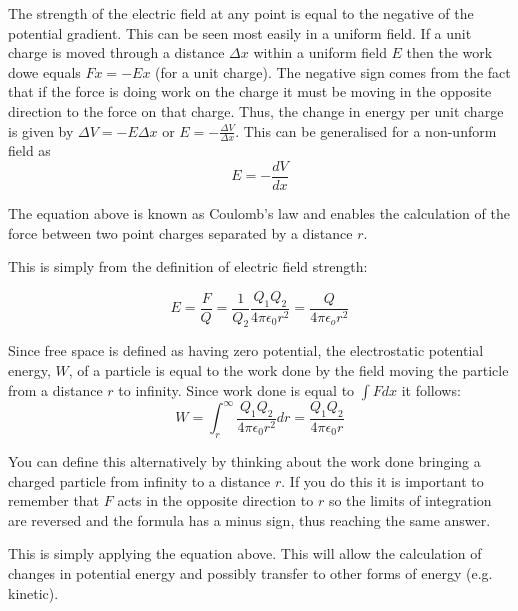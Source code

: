 \documentclass[main.tex]{subfiles}
\begin{document}

The strength of the electric field at any point is equal to the negative of the potential gradient. This can be seen most easily in a uniform field. If a unit charge is moved through a distance $\Delta x$ within a uniform field $E$ then the work dowe equals $Fx = -Ex$ (for a unit charge). The negative sign comes from the fact that if the force is doing work on the charge it must be moving in the opposite direction to the force on that charge. Thus, the change in energy per unit charge is given by $\Delta V = -E\Delta x$ or $E = -\frac{\Delta V}{\Delta x}$. This can be generalised for a non-unform field as
\[ E = - \frac{dV}{dx} \]


The equation above is known as Coulomb's law and enables the calculation of the force between two point charges separated by a distance $r$.


This is simply from the definition of electric field strength:

\[ E = \frac{F}{Q} = \frac{1}{Q_2} \frac{Q_1 Q_2}{4\pi\epsilon_0 r^2} = \frac{Q}{4\pi\epsilon_o r^2} \]


Since free space is defined as having zero potential, the electrostatic potential energy, $W$, of a particle is equal to the work done by the field moving the particle from a distance $r$ to infinity. Since work done is equal to $\int F dx$ it follows:
\[ W = \int_{r}^\infty \frac{Q_1 Q_2}{4\pi\epsilon_0 r^2} dr = \frac{Q_1 Q_2}{4\pi\epsilon_0 r}\]

You can define this alternatively by thinking about the work done bringing a charged particle from infinity to a distance $r$. If you do this it is important to remember that $F$ acts in the opposite direction to $r$ so the limits of integration are reversed and the formula has a minus sign, thus reaching the same answer.


This is simply applying the equation above. This will allow the calculation of changes in potential energy and possibly transfer to other forms of energy (e.g. kinetic).
\end{document}

